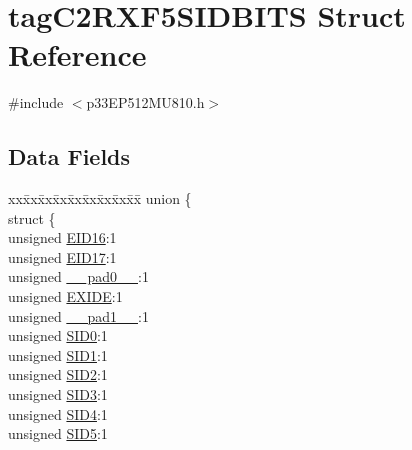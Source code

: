 \hypertarget{structtag_c2_r_x_f5_s_i_d_b_i_t_s}{}\section{tag\+C2\+R\+X\+F5\+S\+I\+D\+B\+I\+TS Struct Reference}
\label{structtag_c2_r_x_f5_s_i_d_b_i_t_s}


{\ttfamily \#include $<$p33\+E\+P512\+M\+U810.\+h$>$}

\subsection*{Data Fields}
\begin{DoxyCompactItemize}
\item 
\begin{tabbing}
xx\=xx\=xx\=xx\=xx\=xx\=xx\=xx\=xx\=\kill
union \{\\
\>struct \{\\
\>\>unsigned \hyperlink{structtag_c2_r_x_f5_s_i_d_b_i_t_s_a6dd5663b0c9838c56db040560ca0efa1}{EID16}:1\\
\>\>unsigned \hyperlink{structtag_c2_r_x_f5_s_i_d_b_i_t_s_aa648615464b0eb29967529333eee9fd9}{EID17}:1\\
\>\>unsigned \hyperlink{structtag_c2_r_x_f5_s_i_d_b_i_t_s_adf71f3d8410c1f1dbbc96680a92c49af}{\_\_pad0\_\_}:1\\
\>\>unsigned \hyperlink{structtag_c2_r_x_f5_s_i_d_b_i_t_s_a09ff1c1be3927220bd3dfbc10edfe243}{EXIDE}:1\\
\>\>unsigned \hyperlink{structtag_c2_r_x_f5_s_i_d_b_i_t_s_acaf2d0924a107ec6e8d2e31febaf66f9}{\_\_pad1\_\_}:1\\
\>\>unsigned \hyperlink{structtag_c2_r_x_f5_s_i_d_b_i_t_s_a1ca276ac15df60e1f7b9a6d0011ade93}{SID0}:1\\
\>\>unsigned \hyperlink{structtag_c2_r_x_f5_s_i_d_b_i_t_s_a3405d354f81391f879648f69f504dfc8}{SID1}:1\\
\>\>unsigned \hyperlink{structtag_c2_r_x_f5_s_i_d_b_i_t_s_ad744966dfc49307f731b7045b01b94e5}{SID2}:1\\
\>\>unsigned \hyperlink{structtag_c2_r_x_f5_s_i_d_b_i_t_s_a9345f3e64720be93e83d8dfc827f3f45}{SID3}:1\\
\>\>unsigned \hyperlink{structtag_c2_r_x_f5_s_i_d_b_i_t_s_aefb106fed4bb40e2c3c71ac612c554e3}{SID4}:1\\
\>\>unsigned \hyperlink{structtag_c2_r_x_f5_s_i_d_b_i_t_s_a0f221b3c9612231686bf87ccdcec8489}{SID5}:1\\

\end{tabbing}
\end{DoxyCompactItemize}
